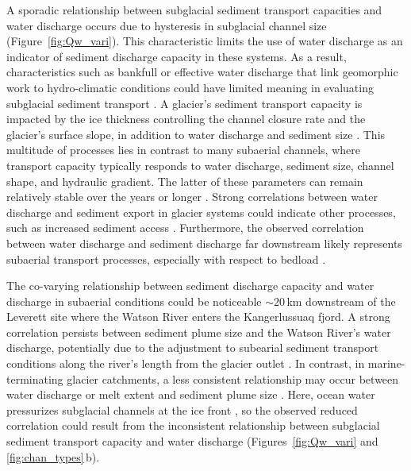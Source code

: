 \documentclass[tc, manuscript]{copernicus}
\begin{document}
A sporadic relationship between subglacial sediment transport capacities and water discharge occurs due to hysteresis in subglacial channel size (Figure~\ref{fig:Qw_vari}).
This characteristic limits the use of water discharge as an indicator of sediment discharge capacity in these systems.
As a result, characteristics such as bankfull or effective water discharge that link geomorphic work to hydro-climatic conditions could have limited meaning in evaluating subglacial sediment transport \citep{wolman1960,lenzi2006}.
A glacier's sediment transport capacity is impacted by the ice thickness controlling the channel closure rate and the glacier's surface slope, in addition to water discharge and sediment size \citep[Figure~\ref{fig:multi_run}, Section~\ref{sect:sub_mode}; ][]{rothlisberger1972,gimbert2016,stevens2022,walder1994}.
This multitude of processes lies in contrast to many subaerial channels, where transport capacity typically responds to water discharge, sediment size, channel shape,  and hydraulic gradient.
The latter of these parameters can remain relatively stable over the years or longer \citep[Section~\ref{sect:fluv}; e.g.][]{tucker1997}.
Strong correlations between water discharge and sediment export in glacier systems could indicate other processes, such as increased sediment access \citep{zhang2022}.
Furthermore, the observed correlation between water discharge and sediment discharge far downstream likely represents subaerial transport processes, especially with respect to bedload \citep{mancini2023}.

The co-varying relationship between sediment discharge capacity and water discharge in subaerial conditions could be noticeable $\sim20$\,\unit{km} downstream of the Leverett site where the Watson River enters the Kangerlussuaq fjord.
A strong correlation persists between sediment plume size and the Watson River's water discharge, potentially due to the adjustment to subearial sediment transport conditions along the river's length from the glacier outlet \citep[Figure~\ref{fig:chan_types}\,c; ][]{chu2009,mcgrath2010}.
In contrast, in marine-terminating glacier catchments, a less consistent relationship may occur between water discharge or melt extent and sediment plume size \citep{chu2012,tedstone2012}.
Here, ocean water pressurizes subglacial channels at the ice front \citep[e.g.][]{how2017}, so the observed reduced correlation could result from the inconsistent relationship between subglacial sediment transport capacity and water discharge (Figures~\ref{fig:Qw_vari} and \ref{fig:chan_types}\,b).
\end{document}
